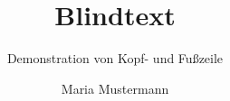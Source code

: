 \documentclass{scrbook}
\title{Blindtext}
\subtitle{Demonstration von Kopf- und Fußzeile}
\author{Maria Mustermann}
\begin{document}
  \maketitle
  \tableofcontents

  \Blinddocument
  \Blinddocument
  \Blinddocument
  \Blinddocument
  \Blinddocument
\end{document}

